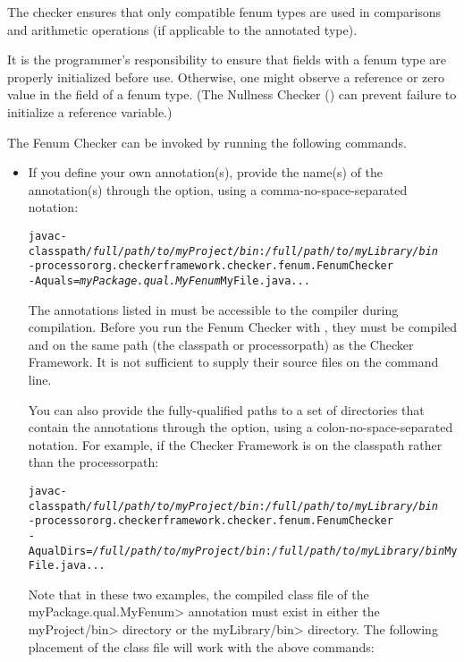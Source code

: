 The checker ensures that
only compatible fenum types are used in comparisons and arithmetic operations
(if applicable to the annotated type).

It is the programmer's responsibility to ensure that fields with a fenum type
are properly initialized before use.  Otherwise, one might observe a 
reference or zero value in the field of a fenum type.  (The Nullness Checker
() can prevent failure to initialize a
reference variable.)



The Fenum Checker can be invoked by running the following commands.

\begin{itemize}
  \item
If you define your own annotation(s), provide the name(s) of the annotation(s)
through the  option, using a comma-no-space-separated notation:

\begin{alltt}
  javac -classpath \textit{/full/path/to/myProject/bin}:\textit{/full/path/to/myLibrary/bin} \ttbs
        -processor org.checkerframework.checker.fenum.FenumChecker \ttbs
        -Aquals=\textit{myPackage.qual.MyFenum} MyFile.java ...
\end{alltt}

The annotations listed in  must be accessible to
the compiler during compilation.  Before you run the Fenum Checker with
, they must be compiled and on the same path (the classpath or
processorpath) as the Checker Framework.  It
is not sufficient to supply their source files on the command line.

You can also provide the fully-qualified paths to a set of directories
that contain the annotations through the  option,
using a colon-no-space-separated notation. For example,
if the Checker Framework is on the classpath rather than the processorpath:

\begin{alltt}
  javac -classpath \textit{/full/path/to/myProject/bin}:\textit{/full/path/to/myLibrary/bin} \ttbs
        -processor org.checkerframework.checker.fenum.FenumChecker \ttbs
        -AqualDirs=\textit{/full/path/to/myProject/bin}:\textit{/full/path/to/myLibrary/bin} MyFile.java ...
\end{alltt}

Note that in these two examples, the compiled class file of the
\<myPackage.qual.MyFenum> annotation must exist in either the \<myProject/bin>
directory or the \<myLibrary/bin> directory. The following placement of
the class file will work with the above commands:


\end{itemize}
